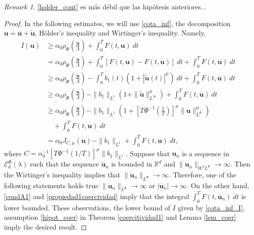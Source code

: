 \documentclass[twoside]{article}
\theoremstyle{remark}
\newtheorem{comentario}{Remark}
\newcommand{\orlnor}{\|_{L^{\Phi}}}
\newcommand{\lphi}{L^{\Phi}}
\newcommand{\sobnor}{\|_{W^{1}\lphi}}
\newcommand{\domi}{\mathcal{E}^{\Phi}_d(\lambda)}
\renewcommand{\b}[1]{\boldsymbol{#1}}
\newcommand{\rr}{\mathbb{R}}
\begin{document}
{\color{red}
\begin{comentario}
\eqref{holder_cont} es m\'as d\'ebil que las hip\'otesis anteriores...
\end{comentario}}


\begin{proof} In the following estimates, we will use \eqref{cota_inf}, the decomposition $\b{u}=\b{\overline{u}}+\b{\tilde{u}}$, H\"older's inequality and Wirtinger's inequality. Namely,
\begin{equation}\label{cota_inf_I}
\begin{split}
I(\b{u})&\geq\alpha_0\rho_{\Phi}\left( \frac{\b{\dot{u}}}{\Lambda}\right)+\int_0^TF(t,\b{u})\ dt\\ 
&=\alpha_0\rho_{\Phi}\left( \frac{\b{\dot{u}}}{\Lambda}\right)+ \int_0^T \left[F(t,\b{u})-F(t,\b{\overline{u}})\right]\ dt +  \int_0^TF(t,\b{\overline{u}})\ dt\\
&\geq\alpha_0\rho_{\Phi}\left( \frac{\b{\dot{u}}}{\Lambda}\right)- \int_0^Tb_1(t)(1+|\b{\tilde{u}}(t)|^{\mu})\ dt +  \int_0^TF(t,\b{\overline{u}})\ dt\\
&\geq \alpha_0\rho_{\Phi}\left( \frac{\b{\dot{u}}}{\Lambda}\right)- \|b_1\|_{L^1}(1+\|\b{\tilde{u}}\|_{L^{\infty}}^{\mu}) +  \int_0^TF(t,\b{\overline{u}})\ dt\\
&\geq\alpha_0\rho_{\Phi}\left( \frac{\b{\dot{u}}}{\Lambda}\right)- \|b_1\|_{L^1}\left(1+\left[T\Phi^{-1}\left(\frac{1}{T}\right)\right]^{\mu}\|\b{\dot u}\orlnor^{\mu}\right) \\
&\quad+  \int_0^TF(t,\b{\overline{u}})\ dt\\
&=\alpha_0J_{C,\mu}(\b{\dot{u}})- \|b_1\|_{L^1}+ \int_0^TF(t,\b{\overline{u}})\ dt,
\end{split}
\end{equation}
where $C=\alpha_0^{-1}\left[T\Phi^{-1}\left(1/T\right)\right]^{\mu}\|b_1\|_{L^1}$.
Suppose that $\b{u}_n$ is a sequence in $\domi$ such that 
the  sequence  $\b{\overline{u}}_n$ is bounded in $\rr^d$ and 
$\|\b{u}_n\sobnor\to\infty$. Then  the Wirtinger's inequality implies that $\|\b{\dot{u}}_n\orlnor\to\infty$. 
Therefore, one of the following statements holds true $\|\b{\dot{u}}_n\orlnor\to\infty$ or $|\b{\overline{u}}_n|\to \infty$. 
On the other hand,  \eqref{condA1} and \eqref{propiedad1coercividad}
imply that the integral $\int_0^TF(t,\b{\overline{u}}_n)\ dt$ is lower bounded. 
These observations, the lower bound of $I$ given by \eqref{cota_inf_I}, 
assumption \ref{hipot_coer} in Theorem \ref{coercitividad1} and Lemma \ref{lem_coer} imply the desired result.
\end{proof}
\end{document}

